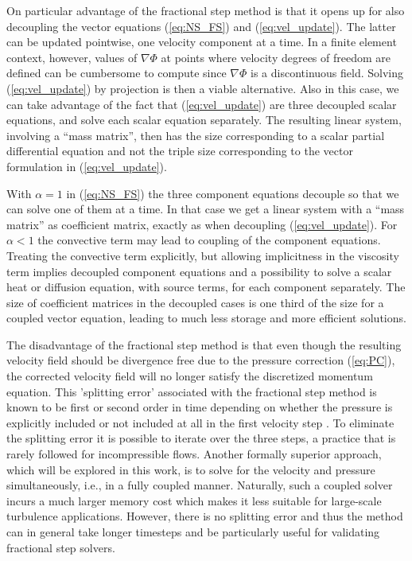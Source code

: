 On particular advantage of the fractional step method is that it opens
up for also decoupling the vector equations (\ref{eq:NS_FS})
and (\ref{eq:vel_update}). The latter can be updated pointwise,
one velocity component at a time. In a finite element context, however,
values of $\nabla\Phi$ at points where velocity degrees of freedom
are defined can be cumbersome to compute since $\nabla\Phi$ is
a discontinuous field. Solving (\ref{eq:vel_update}) by projection
is then a viable alternative. Also in this case, we can take advantage
of the fact that (\ref{eq:vel_update}) are three decoupled
scalar equations, and solve each scalar equation separately.
The resulting linear system, involving a ``mass matrix'', then has the size
corresponding to a scalar partial differential equation and not the
triple size corresponding to the vector formulation in (\ref{eq:vel_update}).

With $\alpha =1$ in (\ref{eq:NS_FS}) the three component equations
decouple so that we can solve one of them at a time. In that case
we get a linear system with a ``mass matrix'' as coefficient matrix,
exactly as when decoupling (\ref{eq:vel_update}).
For $\alpha <1$ the convective term may lead to coupling of the
component equations. Treating the convective term explicitly, but
allowing implicitness in the viscosity term implies decoupled
component equations and a possibility to solve a scalar heat or
diffusion equation, with source terms, for each component separately.
The size of coefficient matrices in the decoupled cases is one third
of the size for a coupled vector equation, leading to much less
storage and more efficient solutions.


The disadvantage of the fractional step method is
that even though the resulting velocity field should be divergence
free due to the pressure correction (\ref{eq:PC}),
the corrected velocity field will
no longer satisfy the discretized momentum equation. This 'splitting
error' associated with the fractional step method is known to be first
or second order in time depending on whether the pressure is
explicitly included or not included at all in the first velocity
step \cite{Gue06}. To eliminate the splitting error it is possible to iterate over
the three steps, a practice that is rarely followed for incompressible
flows. Another formally superior approach, which will be explored in
this work, is to solve for the velocity and pressure
simultaneously, i.e., in a fully coupled manner.
Naturally, such a coupled solver incurs a much larger
memory cost which makes it  less suitable for large-scale turbulence
applications. However, there is no splitting error and thus the method
can in general take longer timesteps and be particularly useful for
validating fractional step solvers.

